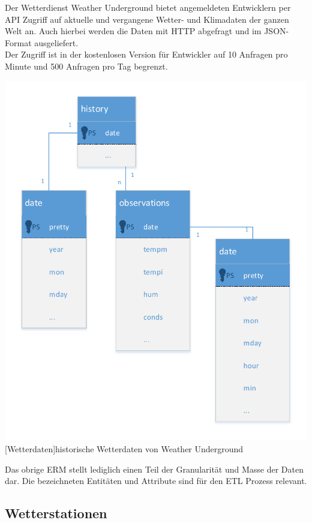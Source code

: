 \documentclass[a4paper,12pt]{scrartcl}
\makeatletter
\def\ScaleIfNeeded{%
\ifdim\Gin@nat@width>\linewidth
\linewidth
\else
\Gin@nat@width
\fi
}
\makeatother
\begin{document}
Der Wetterdienst Weather Underground bietet angemeldeten Entwicklern per API Zugriff auf aktuelle und vergangene Wetter- und Klimadaten der ganzen Welt an. Auch hierbei werden die Daten mit HTTP abgefragt und im JSON-Format ausgeliefert.\\
Der Zugriff ist in der kostenlosen Version für Entwickler auf 10 Anfragen pro Minute und 500 Anfragen pro Tag begrenzt.

\begin{center}
\centering
\includegraphics[width=\ScaleIfNeeded]{../Weather.pdf}%
[Wetterdaten]{historische Wetterdaten von Weather Underground}%
\end{center}

Das obrige ERM stellt lediglich einen Teil der Granularität und Masse der Daten dar. Die bezeichneten Entitäten und Attribute sind für den ETL Prozess relevant.



\subsection{Wetterstationen}
\end{document}
